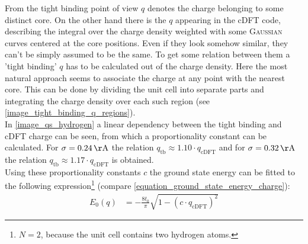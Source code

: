 From the tight binding point of view $q$ denotes the charge belonging to some distinct core. On the other hand there is the $q$ appearing in the cDFT code, describing the integral over the charge density weighted with some \textsc{Gaussian} curves centered at the core positions. Even if they look somehow similar, they can't be simply assumed to be the same. To get some relation between them a 'tight binding' $q$ has to be calculated out of the charge density. Here the most natural approach seems to associate the charge at any point with the nearest core. This can be done by dividing the unit cell into separate parts and integrating the charge density over each such region (see \cref{image_tight_binding_q_regions}).\\
In \cref{image_qs_hydrogen} a linear dependency between the tight binding and cDFT charge can be seen, from which a proportionality constant can be calculated. For $\sigma = \unit[0.24]{\AA}$ the relation $q_\text{tb} \approx 1.10\cdot q_\text{cDFT}$ and for $\sigma = \unit[0.32]{\AA}$ the relation $q_\text{tb} \approx 1.17\cdot q_\text{cDFT}$ is obtained.\\
Using these proportionality constants $c$ the ground state energy can be fitted to the following expression\footnote{$N=2$, because the unit cell contains two hydrogen atoms.} (compare \cref{equation_ground_state_energy_charge}):
\begin{align}
	E_0(q) &= -\frac{8t_0}{\pi} \sqrt{1 - \left(c\cdot q_\text{cDFT}\right)^2}
\end{align}

